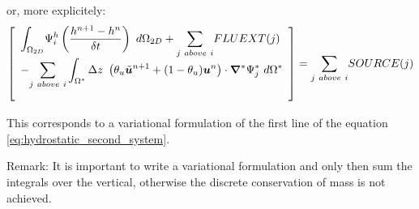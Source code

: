 or, more explicitely:%
\begin{equation}
\left[\begin{array}{l}
\displaystyle{\int_{\Omega_{2D}}}\Psi_{i}^{h}\left(\dfrac{h^{n+1}-h^{n}}{\delta
t}\right)~d\Omega_{2D}+
{\displaystyle\sum_{j~above~i}}FLUEXT(j)\\\bigskip
-\displaystyle{\sum_{j~above~i}}\int\nolimits_{\Omega^{\ast}}\Delta
z~\left(\theta_{u}\tilde{\vec{u}}^{n+1}+(1-\theta_{u})\vec{u}^{n}\right)\cdot\Grad^{\ast}\Psi_{j}^*~d\Omega^{\ast}
\end{array}\right]
={\displaystyle\sum_{j~above~i}}SOURCE(j)\label{eq:hequation}
\end{equation}

This corresponds to a variational formulation of the first
line of the equation \eqref{eq:hydrostatic_second_system}.

\begin{CommentBlock}{Remark:}
It is important to write a variational formulation and only then sum the integrals over the vertical,
otherwise the discrete conservation of mass is not achieved.
\end{CommentBlock}

